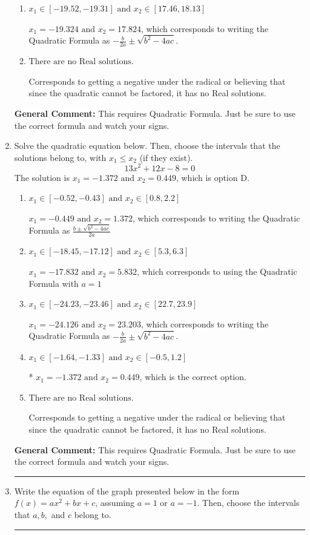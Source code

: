 \documentclass{extbook}[14pt]
\newcommand{\litem}[1]{\item #1

\rule{\textwidth}{0.4pt}}
\begin{document}
\begin{enumerate}
{\begin{enumerate}[label=\Alph*.]
 $x_1 = -1.787 \text{ and } x_2 = 16.787$, which corresponds to using the Quadratic Formula with $a=1$
\item \( x_1 \in [-19.52, -19.31] \text{ and } x_2 \in [17.46, 18.13] \)

 $x_1 = -19.324 \text{ and } x_2 = 17.824$, which corresponds to writing the Quadratic Formula as $-\frac{b}{2a} \pm \sqrt{b^2 - 4ac}$.
\item \( \text{There are no Real solutions.} \)

Corresponds to getting a negative under the radical or believing that since the quadratic cannot be factored, it has no Real solutions.
\end{enumerate}

\textbf{General Comment:} This requires Quadratic Formula. Just be sure to use the correct formula and watch your signs.
}
\litem{
Solve the quadratic equation below. Then, choose the intervals that the solutions belong to, with $x_1 \leq x_2$ (if they exist).
\[ 13x^{2} +12 x -8 = 0 \]
The solution is \( x_1 = -1.372 \text{ and } x_2 = 0.449 \), which is option D.\begin{enumerate}[label=\Alph*.]
\item \( x_1 \in [-0.52, -0.43] \text{ and } x_2 \in [0.8, 2.2] \)

 $x_1 = -0.449 \text{ and } x_2 = 1.372$, which corresponds to writing the Quadratic Formula as $\frac{b \pm \sqrt{b^2 - 4ac}}{2a}$
\item \( x_1 \in [-18.45, -17.12] \text{ and } x_2 \in [5.3, 6.3] \)

 $x_1 = -17.832 \text{ and } x_2 = 5.832$, which corresponds to using the Quadratic Formula with $a=1$
\item \( x_1 \in [-24.23, -23.46] \text{ and } x_2 \in [22.7, 23.9] \)

 $x_1 = -24.126 \text{ and } x_2 = 23.203$, which corresponds to writing the Quadratic Formula as $-\frac{b}{2a} \pm \sqrt{b^2 - 4ac}$.
\item \( x_1 \in [-1.64, -1.33] \text{ and } x_2 \in [-0.5, 1.2] \)

* $x_1 = -1.372 \text{ and } x_2 = 0.449$, which is the correct option.
\item \( \text{There are no Real solutions.} \)

Corresponds to getting a negative under the radical or believing that since the quadratic cannot be factored, it has no Real solutions.
\end{enumerate}

\textbf{General Comment:} This requires Quadratic Formula. Just be sure to use the correct formula and watch your signs.
}
\litem{
Write the equation of the graph presented below in the form $f(x)=ax^2+bx+c$, assuming  $a=1$ or $a=-1$. Then, choose the intervals that $a, b,$ and $c$ belong to.

}
\end{enumerate}
\end{document}
